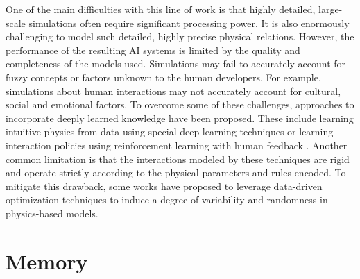 \documentclass[10pt,journal,compsoc]{IEEEtran}
\begin{document}
	One of the main difficulties with this line of work is that highly detailed, large-scale simulations often require significant processing power. It is also enormously challenging to model such detailed, highly precise physical relations. However, the performance of the resulting AI systems is limited by the quality and completeness of the models used. Simulations may fail to accurately account for fuzzy concepts or factors unknown to the human developers. For example, simulations about human interactions may not accurately account for cultural, social and emotional factors. To overcome some of these challenges, approaches to incorporate deeply learned knowledge have been proposed. These include learning intuitive physics from data using special deep learning techniques \cite{piloto2022intuitive,hao2022physics} or learning interaction policies using reinforcement learning with human feedback \cite{wang2024srlm,chaudhari2024rlhf,laleh2024survey}.  Another common limitation is that the interactions modeled by these techniques are rigid and operate strictly according to the physical parameters and rules encoded. To mitigate this drawback, some works \cite{chan2024balancing,tremblay2018training} have proposed to leverage data-driven optimization techniques to induce a degree of variability and randomness in physics-based models. 
	
	
	
	
	
	
	
	\section{Memory }
	
\end{document}
